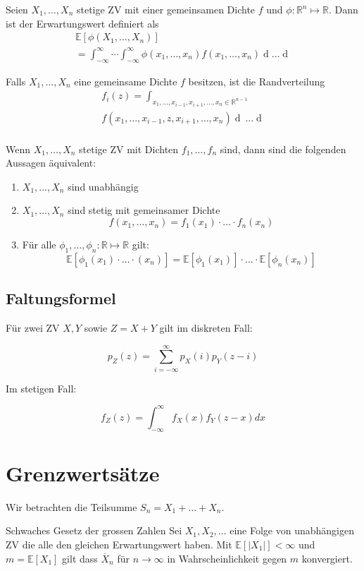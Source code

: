 \documentclass[a4paper,10pt]{article}
\def\R{\mathbb{R}}
\def\E{\mathbb{E}}
\begin{document}
Seien \(X_1, \ldots, X_n\) stetige ZV mit einer gemeinsamen Dichte \(f\) und \(\phi: \R^n \mapsto \R\). Dann ist der Erwartungswert definiert als
\begin{align*}
	\E[\phi(X_1, \ldots, X_n)] \\= \int_{-\infty}^\infty \cdots \int_{-\infty}^\infty \phi(x_1, \ldots, x_n) f(x_1, \ldots, x_n) \mathop{dx_n} \ldots \mathop{dx_1}
\end{align*}

Falls \(X_1, \ldots, X_n\) eine gemeinsame Dichte \(f\) besitzen, ist die Randverteilung
\begin{align*}
	f_i(z) = \int_{x_1, \ldots, x_{i-1}, x_{i+1}, \ldots, x_n \in \R^{n-1}}               \\
	f(x_1, \ldots, x_{i-1}, z, x_{i+1}, \ldots, x_n) \mathop{dx_n} \ \ldots \mathop{dx_1} \\
\end{align*}

Wenn \(X_1, \ldots, X_n\) stetige ZV mit Dichten \(f_1, \ldots, f_n\) sind, dann sind die folgenden Aussagen äquivalent:
\begin{enumerate}
	\item \(X_1, \ldots, X_n\) sind unabhängig
	\item \(X_1, \ldots, X_n\) sind stetig mit gemeinsamer Dichte
	      \[f(x_1, \ldots, x_n) = f_1(x_1) \cdot \ldots \cdot f_n(x_n)\]
	\item Für alle \(\phi_1, \ldots, \phi_n: \R \mapsto \R\) gilt:
	      \[\E[\phi_1 (x_1)\cdot \ldots\cdot (x_n)] = \E[\phi_1(x_1)] \cdot \ldots \cdot \E[\phi_n(x_n)]\]
\end{enumerate}

\subsection{Faltungsformel}

Für zwei ZV $X, Y$ sowie $Z = X + Y$ gilt im diskreten Fall:

$$
	p_Z(z) = \sum_{i = -\infty}^\infty p_X(i) p_Y(z - i)
$$

Im stetigen Fall:

$$
	f_Z(z) = \int_{-\infty}^\infty f_X(x) f_Y(z - x) dx
$$

\section{Grenzwertsätze}
 Wir betrachten die Teilsumme \(S_n = X_1 + \ldots + X_n\).
\begin{mainbox}{Schwaches Gesetz der grossen Zahlen}
	Sei \(X_1, X_2, \ldots\) eine Folge von unabhängigen ZV die alle den gleichen Erwartungswert haben. Mit \(\E[|X_1|] < \infty\) und \(m = \E[X_1]\) gilt dass $\overline{X}_n$ für $n \to \infty$ in Wahrscheinlichkeit gegen $m$ konvergiert.
\end{mainbox}
\end{document}
